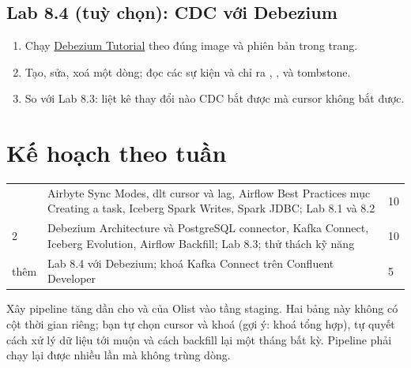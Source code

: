 \subsection{Lab 8.4 (tuỳ chọn): CDC với Debezium}
\begin{enumerate}
  \item Chạy \href{https://debezium.io/documentation/reference/stable/tutorial.html}{Debezium Tutorial} theo đúng image và phiên bản trong trang.
  \item Tạo, sửa, xoá một dòng; đọc các sự kiện và chỉ ra , ,  và tombstone.
  \item So với Lab 8.3: liệt kê thay đổi nào CDC bắt được mà cursor không bắt được.
\end{enumerate}

\section{Kế hoạch theo tuần}
\begin{xltabular}{\textwidth}{@{}P{1.4cm} L P{1.4cm}@{}}
\toprule
{} &  &  \\
\midrule
\endhead
\bottomrule
{} & Airbyte Sync Modes, dlt cursor và lag, Airflow Best Practices mục Creating a task, Iceberg Spark Writes, Spark JDBC; Lab 8.1 và 8.2 & 10 \\
2 & Debezium Architecture và PostgreSQL connector, Kafka Connect, Iceberg Evolution, Airflow Backfill; Lab 8.3; thử thách kỹ năng & 10 \\
thêm & Lab 8.4 với Debezium; khoá Kafka Connect trên Confluent Developer & 5 \\
\end{xltabular}

\begin{thuthach}
Xây pipeline tăng dần cho  và  của Olist vào tầng staging. Hai bảng này không có cột thời gian riêng; bạn tự chọn cursor và khoá (gợi ý: khoá tổng hợp), tự quyết cách xử lý dữ liệu tới muộn và cách backfill lại một tháng bất kỳ. Pipeline phải chạy lại được nhiều lần mà không trùng dòng.
\end{thuthach}

